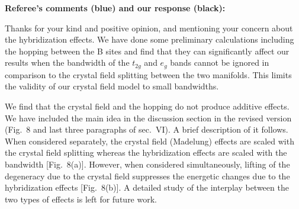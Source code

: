 \documentclass[a4paper,prb]{revtex4-1}  %
\newcommand{\rev}[1]{{\color{blue}{#1}}}
\begin{document}
\textbf{Referee's comments (blue) and our response (black):}
\\

\rev{
The paper "Jahn-Teller effect with rigid octahedral rotations in
perovskites" by R. Naheed and co-authors represents in my opinion a
very nice piece of work, where the authors thoroughly study a rather
complicated subject of influence of rotation and tilting on lifting
orbital degeneracy. However, it has to be mentioned that there is one
rather general point, which must be cleared out before the decision
can be made.

The present treatment follows a general route often taken in the JT
physics: to consider the effect of Madelung field, but there is also
another extremely important contribution to the crystal field coming
from the hybridization, i.e. the overlap between orbitals centered on
different sites. Typically it acts in the same direction, but this
effect should be taken into account for the quantitative results, on
which the authors aimed. The angle dependence of the hopping
integrals, can be considered via the Slater-Koster approximation.
Other, more technical comments:
}

Thanks for your kind and positive opinion,
and mentioning your concern about the hybridization effects.
We have done some preliminary calculations 
including the hopping between the B sites
and find that they can significantly affect our results when
the bandwidth of the $t_{2g}$ and $e_g$ bands cannot be ignored in comparison to the crystal field splitting between the two manifolds. 
This limits the validity of our crystal field model to small bandwidths.

We find that the crystal field and the hopping do not produce additive effects.
We have included the main idea
in the discussion section in the revised version
(Fig.~8 and last three paragraphs of sec.~VI). A brief description of it follows.
When considered separately, 
the crystal field (Madelung) effects are scaled with the crystal field splitting
whereas the hybridization effects are scaled
with the bandwidth [Fig.~8(a)].
However,
when considered simultaneously,
lifting of the degeneracy due to the crystal field 
suppresses the energetic changes due to the hybridization effects [Fig.~8(b)].
A detailed study of the interplay between the two types of effects is left for future work.
\end{document}
